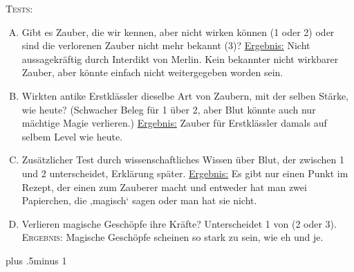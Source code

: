 \begin{centering}
\begin{samepage}
\scshape Tests:
\itshape
 \begin{enumerate}[A.]{
 \firmlist
 \setlength{\leftmargin}{\parindent}
 \setlength{\rightmargin}{1cm}}
\item Gibt es Zauber, die wir kennen, aber nicht wirken können (1 oder 2) oder sind die verlorenen Zauber nicht mehr bekannt (3)? \uline{Ergebnis:} Nicht aussagekräftig durch Interdikt von Merlin. Kein bekannter nicht wirkbarer Zauber, aber könnte einfach nicht weitergegeben worden sein.
\item Wirkten antike Erstklässler dieselbe Art von Zaubern, mit der selben Stärke, wie heute? (Schwacher Beleg für 1 über 2, aber Blut könnte auch nur mächtige Magie verlieren.) \uline{Ergebnis:} Zauber für Erstklässler damals auf selbem Level wie heute.
\item Zusätzlicher Test durch wissenschaftliches Wissen über Blut, der zwischen 1 und 2 unterscheidet, Erklärung später. \uline{Ergebnis:} Es gibt nur einen Punkt im Rezept, der einen zum Zauberer macht und entweder hat man zwei Papierchen, die ‚magisch‘ sagen oder man hat sie nicht.
\item Verlieren magische Geschöpfe ihre Kräfte? Unterscheidet 1 von (2 oder 3). {\scshape Ergebnis:} Magische Geschöpfe scheinen so stark zu sein, wie eh und je.
 \end{enumerate}
\end{samepage}
\end{centering}
\baselineskip plus .5\textheight minus 1\baselineskip
\restoretrivseps

